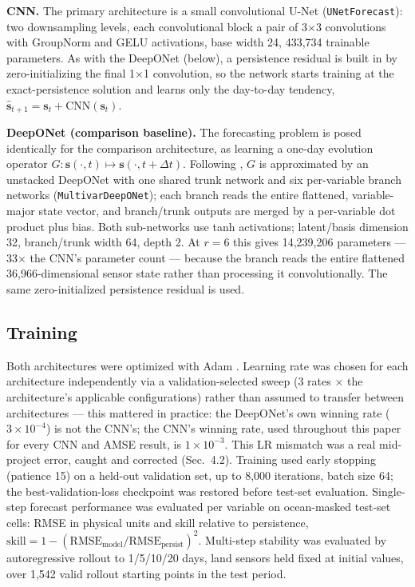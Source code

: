 \documentclass[11pt]{article}
\begin{document}
\textbf{CNN.} The primary architecture is a small convolutional U-Net (\texttt{UNetForecast}): two downsampling levels, each convolutional block a pair of 3$\times$3 convolutions with GroupNorm and GELU activations, base width 24, 433,734 trainable parameters. As with the DeepONet (below), a persistence residual is built in by zero-initializing the final 1$\times$1 convolution, so the network starts training at the exact-persistence solution and learns only the day-to-day tendency, $\hat{\mathbf{s}}_{t+1} = \mathbf{s}_t + \mathrm{CNN}(\mathbf{s}_t)$.

\textbf{DeepONet (comparison baseline).} The forecasting problem is posed identically for the comparison architecture, as learning a one-day evolution operator $G: \mathbf{s}(\cdot,t) \mapsto \mathbf{s}(\cdot,t+\Delta t)$. Following \citet{Lu2021}, $G$ is approximated by an unstacked DeepONet with one shared trunk network and six per-variable branch networks (\texttt{MultivarDeepONet}); each branch reads the entire flattened, variable-major state vector, and branch/trunk outputs are merged by a per-variable dot product plus bias. Both sub-networks use tanh activations; latent/basis dimension 32, branch/trunk width 64, depth 2. At $r=6$ this gives 14,239,206 parameters --- 33$\times$ the CNN's parameter count --- because the branch reads the entire flattened 36,966-dimensional sensor state rather than processing it convolutionally. The same zero-initialized persistence residual is used.

\subsection{Training}

Both architectures were optimized with Adam \citep[]{Kingma2014}. Learning rate was chosen for each architecture independently via a validation-selected sweep (3 rates $\times$ the architecture's applicable configurations) rather than assumed to transfer between architectures --- this mattered in practice: the DeepONet's own winning rate ($3\times10^{-4}$) is not the CNN's; the CNN's winning rate, used throughout this paper for every CNN and AMSE result, is $1\times10^{-3}$. This LR mismatch was a real mid-project error, caught and corrected (Sec.~4.2). Training used early stopping (patience 15) on a held-out validation set, up to 8,000 iterations, batch size 64; the best-validation-loss checkpoint was restored before test-set evaluation. Single-step forecast performance was evaluated per variable on ocean-masked test-set cells: RMSE in physical units and skill relative to persistence, $\text{skill} = 1-(\text{RMSE}_{\text{model}}/\text{RMSE}_{\text{persist}})^2$. Multi-step stability was evaluated by autoregressive rollout to 1/5/10/20 days, land sensors held fixed at initial values, over 1,542 valid rollout starting points in the test period.
\end{document}
